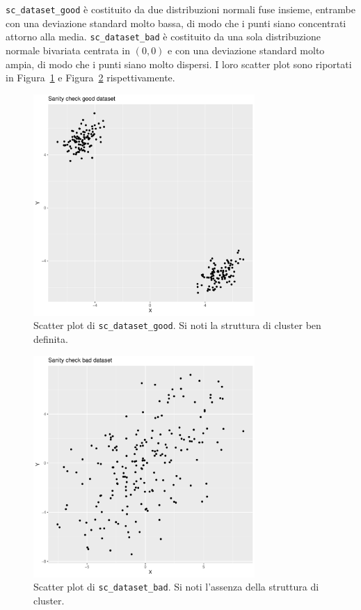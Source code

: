 \documentclass[a4paper, 12pt]{report}
\begin{document}
			\texttt{sc\_dataset\_good} è costituito da due distribuzioni
			normali fuse insieme, entrambe con una deviazione standard
			molto bassa, di modo che i punti siano concentrati attorno
			alla media. \texttt{sc\_dataset\_bad} è costituito da una
			sola distribuzione normale bivariata centrata in $(0, 0)$ e
			con una deviazione standard molto ampia, di modo che i punti
			siano molto dispersi. I loro scatter plot sono riportati in
			Figura~\ref{fig:sc1} e Figura~\ref{fig:sc2} rispettivamente.

			\begin{figure}[H]
				\centering
				\includegraphics[width = 0.75\textwidth, height = 0.45\textheight]{doc/sc_dataset_good.pdf}
				\caption{Scatter plot di \texttt{sc\_dataset\_good}.
				Si noti la struttura di cluster ben definita.}
				\label{fig:sc1}
			\end{figure}

			\begin{figure}[H]
				\centering
				\includegraphics[width = 0.75\textwidth, height = 0.45\textheight]{doc/sc_dataset_bad.pdf}
				\caption{Scatter plot di \texttt{sc\_dataset\_bad}.
				Si noti l'assenza della struttura di cluster.}
				\label{fig:sc2}
			\end{figure}
\end{document}
